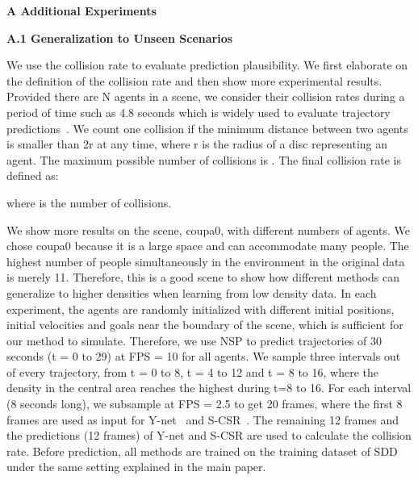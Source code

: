 \documentclass[runningheads]{llncs}
\begin{document}
\noindent
\textbf{\Large A Additional Experiments}
\vspace{15pt}

\noindent
\textbf{\large A.1 Generalization to Unseen Scenarios}
\vspace{10pt}

\noindent
We use the collision rate to evaluate prediction plausibility. We first elaborate on the definition of the collision rate and then show more experimental results. Provided there are N agents in a scene, we consider their collision rates during a period of time such as 4.8 seconds which is widely used to evaluate trajectory predictions~\cite{mangalam2020not,mangalam2021goals,zhou2021sliding}. We count one collision if the minimum distance between two agents is smaller than 2r at any time, where r is the radius of a disc representing an agent. The maximum possible number of collisions is . The final collision rate is defined as:

where  is the number of collisions. 

We show more results on the scene, coupa0, with different numbers of agents. We chose coupa0 because it is a large space and can accommodate many people. The highest number of people simultaneously in the environment in the original data is merely 11. Therefore, this is a good scene to show how different methods can generalize to higher densities when learning from low density data. In each experiment, the agents are randomly initialized with different initial positions, initial velocities and goals near the boundary of the scene, which is sufficient for our method to simulate. Therefore, we use NSP to predict trajectories of 30 seconds (t = 0 to 29) at FPS = 10 for all agents. We sample three intervals out of every trajectory, from t = 0 to 8, t = 4 to 12 and t = 8 to 16, where the density in the central area reaches the highest during t=8 to 16. For each interval (8 seconds long), we subsample at FPS = 2.5 to get 20 frames, where the first 8 frames are used as input for Y-net~\cite{mangalam2021goals} and S-CSR~\cite{zhou2021sliding}. The remaining 12 frames and the predictions (12 frames) of Y-net and S-CSR are used to calculate the collision rate. Before prediction, all methods are trained on the training dataset of SDD under the same setting explained in the main paper.
\end{document}

